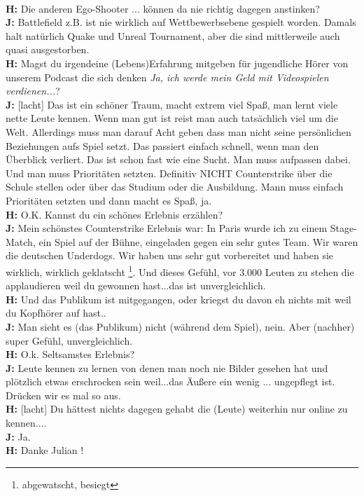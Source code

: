 \\ \textbf{H:} Die anderen Ego-Shooter ... können da nie richtig dagegen anstinken?
\\ \textbf{J:} Battlefield z.B. ist nie wirklich auf Wettbewerbsebene gespielt worden. Damals halt natürlich Quake und Unreal Tournament, aber die sind mittlerweile auch quasi ausgestorben.
\\ \textbf{H:} Magst du irgendeine (Lebens)Erfahrung mitgeben für jugendliche Hörer von unserem Podcast die sich denken \textit{Ja, ich werde mein Geld mit Videospielen verdienen...}?
\\ \textbf{J:} [lacht] Das ist ein schöner Traum, macht extrem viel Spaß, man lernt viele nette Leute kennen. Wenn man gut ist reist man auch tatsächlich viel um die Welt. Allerdings muss man darauf Acht geben dass man nicht seine persönlichen Beziehungen aufs Spiel setzt. Das passiert einfach schnell, wenn man den Überblick verliert. Das ist schon fast wie eine Sucht. Man muss aufpassen dabei. Und man muss Prioritäten setzten. Definitiv NICHT Counterstrike über die Schule stellen oder über das Studium oder die Ausbildung. Mann muss einfach Prioritäten setzten und dann macht es Spaß, ja.
\\ \textbf{H:} O.K. Kannst du ein schönes Erlebnis erzählen?
\\ \textbf{J:} Mein schönstes Counterstrike Erlebnis war: In Paris wurde ich zu einem Stage-Match, ein Spiel auf der Bühne, eingeladen gegen ein sehr gutes Team. Wir waren die deutschen Underdogs. Wir haben uns sehr gut vorbereitet und haben sie wirklich, wirklich geklatscht \footnote{abgewatscht, besiegt}. Und dieses Gefühl, vor 3.000 Leuten zu stehen die applaudieren weil du gewonnen hast...das ist unvergleichlich.
\\ \textbf{H:} Und das Publikum ist mitgegangen, oder kriegst du davon eh nichts mit weil du Kopfhörer auf hast..
\\ \textbf{J:} Man sieht es (das Publikum) nicht (während dem Spiel), nein. Aber (nachher) super Gefühl, unvergleichlich.
\\ \textbf{H:} O.k. Seltsamstes Erlebnis?
\\ \textbf{J:} Leute kennen zu lernen von denen man noch nie Bilder gesehen hat und plötzlich etwas erschrocken sein weil...das Äußere ein wenig ... ungepflegt ist. Drücken wir es mal so aus.
\\ \textbf{H:} [lacht] Du hättest nichts dagegen gehabt die (Leute) weiterhin nur online zu kennen....
\\ \textbf{J:} Ja.
\\ \textbf{H:} Danke Julian !

